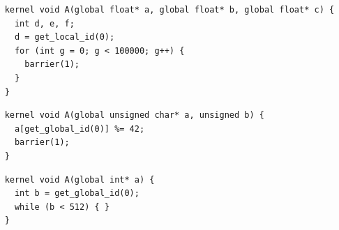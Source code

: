 
\newsavebox{\NvidiaOptLoopHang}
\begin{lrbox}{\NvidiaOptLoopHang}
  \hspace{1.5em}
  \begin{lstlisting}
    kernel void A(global float* a, global float* b, global float* c) {
      int d, e, f;
      d = get_local_id(0);
      for (int g = 0; g < 100000; g++) {
        barrier(1);
      }
    }
  \end{lstlisting}
\end{lrbox}

\newsavebox{\XeonPhiSpin}
\begin{lrbox}{\XeonPhiSpin}
  \hspace{1.5em}
  \begin{lstlisting}
    kernel void A(global unsigned char* a, unsigned b) {
      a[get_global_id(0)] %= 42;
      barrier(1);
    }
  \end{lstlisting}
\end{lrbox}

\newsavebox{\IntelOptLoopHang}
\begin{lrbox}{\IntelOptLoopHang}
  \hspace{1.5em}
  \begin{lstlisting}
    kernel void A(global int* a) {
      int b = get_global_id(0);
      while (b < 512) { }
    }
  \end{lstlisting}
\end{lrbox}


